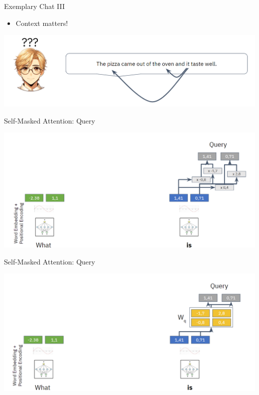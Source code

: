 \documentclass[aspectratio=169]{../latex_main/tntbeamer}  %
\begin{document}
        \begin{frame}{Exemplary Chat III}

            \begin{itemize}
                \item Context matters!
            \end{itemize}

            \centering
            \includegraphics[width=0.9\linewidth]{figure/transformer6.png}
        
        \end{frame}

        \begin{frame}{Self-Masked Attention: Query}

            \centering
            \includegraphics[width=0.9\linewidth]{figure/transformer7.png}
        
        \end{frame}

        \begin{frame}{Self-Masked Attention: Query}

            \centering
            \includegraphics[width=0.9\linewidth]{figure/transformer8.png}
        
        \end{frame}
\end{document}
